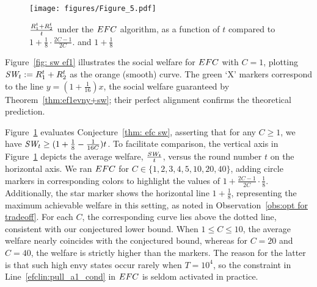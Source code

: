 \begin{figure}
    \centering
        \texttt{[image: figures/Figure\_5.pdf]}
        \caption{$\frac{R_{1}^t+R_{2}^t}{t}$ under the $EFC$ algorithm, as a function of $t$ compared to $1 + \frac{1}{8}\cdot \frac{2C-1}{2C}$. and $1+\frac{1}{8}$}\label{fig: sw efc}
\end{figure}

Figure~\ref{fig: sw ef1} illustrates the social welfare for $EFC$ with $C=1$, plotting 
$\textit{SW}_t := R_1^t + R_2^t$ as the orange (smooth) curve. 
The green `X' markers correspond to the line $y=(1+\frac{1}{16})x$, 
the social welfare guaranteed by Theorem~\ref{thm:ef1evny+sw}; 
their perfect alignment confirms the theoretical prediction.


Figure~\ref{fig: sw efc} evaluates Conjecture~\ref{thm: efc sw}, asserting that for any $C \ge 1$, 
we have $\textit{SW}_t \geq (1+\frac{1}{8}-\frac{1}{16C})t$. 
To facilitate comparison, the vertical axis in Figure~\ref{fig: sw efc} depicts the average welfare, $\tfrac{\textit{SW}_t}{t}$, 
versus the round number $t$ on the horizontal axis. 
We ran $EFC$ for $C \in \{1,2,3,4,5,10,20,40\}$, adding circle markers in corresponding colors to highlight 
the values of $1 + \tfrac{2C - 1}{2C} \cdot \tfrac{1}{8}$. 
Additionally, the star marker shows the horizontal line $1 + \tfrac{1}{8}$, 
representing the maximum achievable welfare in this setting, as noted in Observation~\ref{obs:opt for tradeoff}. 
For each $C$, the corresponding curve lies above the dotted line, 
consistent with our conjectured lower bound. 
When $1 \leq C \leq 10$, the average welfare nearly coincides with the conjectured bound, 
whereas for $C = 20$ and $C = 40$, the welfare is strictly higher than the markers. 
The reason for the latter is that such high envy states occur rarely when $T = 10^4$, 
so the constraint in Line~\ref{efclin:pull_a1_cond} in $EFC$ is seldom activated in practice.

